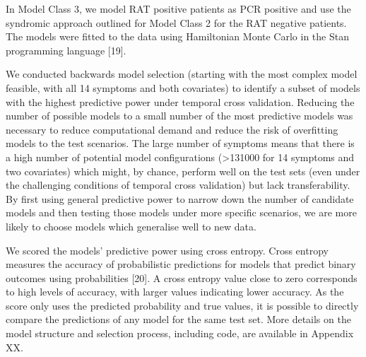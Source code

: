 \documentclass[]{elsarticle} %
\begin{document}
In Model Class 3, we model RAT positive patients as PCR positive and use
the syndromic approach outlined for Model Class 2 for the RAT negative
patients. The models were fitted to the data using Hamiltonian Monte
Carlo in the Stan programming language {[}19{]}.

We conducted backwards model selection (starting with the most complex
model feasible, with all 14 symptoms and both covariates) to identify a
subset of models with the highest predictive power under temporal cross
validation. Reducing the number of possible models to a small number of
the most predictive models was necessary to reduce computational demand
and reduce the risk of overfitting models to the test scenarios. The
large number of symptoms means that there is a high number of potential
model configurations (\textgreater131000 for 14 symptoms and two
covariates) which might, by chance, perform well on the test sets (even
under the challenging conditions of temporal cross validation) but lack
transferability. By first using general predictive power to narrow down
the number of candidate models and then testing those models under more
specific scenarios, we are more likely to choose models which generalise
well to new data.

We scored the models' predictive power using cross entropy. Cross
entropy measures the accuracy of probabilistic predictions for models
that predict binary outcomes using probabilities {[}20{]}. A cross
entropy value close to zero corresponds to high levels of accuracy, with
larger values indicating lower accuracy. As the score only uses the
predicted probability and true values, it is possible to directly
compare the predictions of any model for the same test set. More details
on the model structure and selection process, including code, are
available in Appendix XX.
\end{document}

